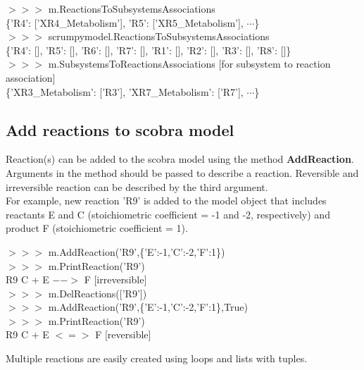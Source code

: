 \begin{framed}
$>>>$ m.ReactionsToSubsystemsAssociations\\
\{'R4': ['XR4\_Metabolism'], 'R5': ['XR5\_Metabolism'], $\cdots$\}\\

$>>>$ scrumpymodel.ReactionsToSubsystemsAssociations\\
\{'R4': [], 'R5': [], 'R6': [], 'R7': [], 'R1': [], 'R2': [], 'R3': [], 'R8': []\}\\

$>>>$ m.SubsystemsToReactionsAssociations [for subsystem to reaction association]\\
\{'XR3\_Metabolism': ['R3'], 'XR7\_Metabolism': ['R7'], $\cdots$\}
\end{framed}


\subsection{Add reactions to scobra model}
Reaction(s) can be added to the scobra model using the method \textbf{AddReaction}. Arguments in the method should be passed to describe a reaction. Reversible and irreversible reaction can be described by the third argument. \\

For example, new reaction 'R9' is added to the model object that includes reactants E and C (stoichiometric coefficient = -1 and -2, respectively) and product F (stoichiometric coefficient = 1). 

\begin{framed}
$>>>$ m.AddReaction('R9',\{'E':-1,'C':-2,'F':1\})\\
$>>>$ m.PrintReaction('R9')\\
R9  C + E $-->$ F [irreversible]\\ 

$>>>$ m.DelReactions(['R9'])\\
$>>>$ m.AddReaction('R9',\{'E':-1,'C':-2,'F':1\},True)\\
$>>>$ m.PrintReaction('R9')\\
R9  C + E $<=>$ F [reversible]
\end{framed}

Multiple reactions are easily created using loops and lists with tuples.


